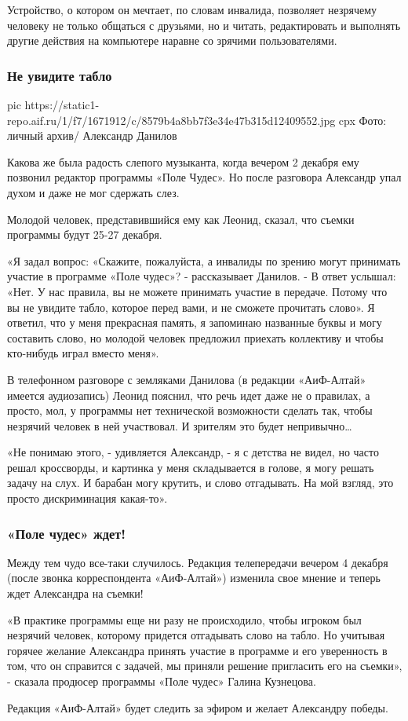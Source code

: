 Устройство, о котором он мечтает, по словам инвалида, позволяет незрячему
человеку не только общаться с друзьями, но и читать, редактировать и выполнять
другие действия на компьютере наравне со зрячими пользователями.

\subsubsection{Не увидите табло}

\ifcmt
pic https://static1-repo.aif.ru/1/f7/1671912/c/8579b4a8bb7f3e34e47b315d12409552.jpg
cpx Фото: личный архив/ Александр Данилов 
\fi

Какова же была радость слепого музыканта, когда вечером 2 декабря ему позвонил
редактор программы «Поле Чудес». Но после разговора Александр упал духом и даже
не мог сдержать слез.

Молодой человек, представившийся ему как Леонид, сказал, что съемки программы
будут 25-27 декабря.

«Я задал вопрос: «Скажите, пожалуйста, а инвалиды по зрению могут принимать
участие в программе «Поле чудес»? - рассказывает Данилов. - В ответ услышал:
«Нет. У нас правила, вы не можете принимать участие в передаче. Потому что вы
не увидите табло, которое перед вами, и не сможете прочитать слово». Я ответил,
что у меня прекрасная память, я запоминаю названные буквы и могу составить
слово, но молодой человек предложил приехать коллективу и чтобы кто-нибудь
играл вместо меня».

В телефонном разговоре с земляками Данилова (в редакции  «АиФ-Алтай» имеется
аудиозапись) Леонид пояснил, что речь идет даже не о правилах, а просто, мол, у
программы нет технической возможности сделать так, чтобы незрячий человек в ней
участвовал. И зрителям это будет непривычно…

«Не понимаю этого, - удивляется Александр, - я с детства не видел, но часто
решал кроссворды, и картинка у меня складывается в голове, я могу решать задачу
на слух. И барабан могу крутить, и слово отгадывать. На мой взгляд, это просто
дискриминация какая-то».

\subsubsection{«Поле чудес» ждет!}

Между тем чудо все-таки случилось. Редакция телепередачи вечером 4 декабря
(после звонка корреспондента «АиФ-Алтай») изменила свое мнение и теперь ждет
Александра на съемки!

«В практике программы еще ни разу не происходило, чтобы игроком был незрячий
человек, которому придется  отгадывать слово на табло. Но учитывая горячее
желание Александра принять участие в программе и его уверенность в том, что он
справится с задачей, мы приняли решение пригласить его на съемки», - сказала
продюсер программы «Поле чудес» Галина Кузнецова.

Редакция «АиФ-Алтай» будет следить за эфиром и желает Александру победы.
